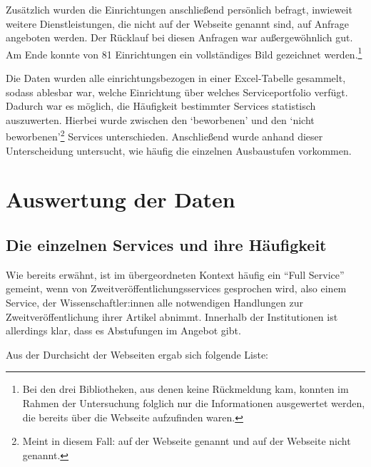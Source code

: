 \documentclass[a4paper,
fontsize=11pt,
oneside,
numbers=noperiodatend,
parskip=half-,
bibliography=totoc,
final
]{scrartcl}
\begin{document}
Zusätzlich wurden die Einrichtungen anschließend persönlich befragt,
inwieweit weitere Dienstleistungen, die nicht auf der Webseite genannt
sind, auf Anfrage angeboten werden. Der Rücklauf bei diesen Anfragen war
außergewöhnlich gut. Am Ende konnte von 81 Einrichtungen ein
vollständiges Bild gezeichnet werden.\footnote{Bei den drei
  Bibliotheken, aus denen keine Rückmeldung kam, konnten im Rahmen der
  Untersuchung folglich nur die Informationen ausgewertet werden, die
  bereits über die Webseite aufzufinden waren.}

Die Daten wurden alle einrichtungsbezogen in einer Excel-Tabelle
gesammelt, sodass ablesbar war, welche Einrichtung über welches
Serviceportfolio verfügt. Dadurch war es möglich, die Häufigkeit
bestimmter Services statistisch auszuwerten. Hierbei wurde zwischen den
\enquote*{beworbenen} und den \enquote*{nicht beworbenen}\footnote{Meint in diesem Fall:
  auf der Webseite genannt und auf der Webseite nicht genannt.} Services
unterschieden. Anschließend wurde anhand dieser Unterscheidung
untersucht, wie häufig die einzelnen Ausbaustufen vorkommen.

\hypertarget{auswertung-der-daten}{%
\section{Auswertung der Daten}\label{auswertung-der-daten}}

\hypertarget{die-einzelnen-services-und-ihre-huxe4ufigkeit}{%
\subsection{Die einzelnen Services und ihre
Häufigkeit}\label{die-einzelnen-services-und-ihre-huxe4ufigkeit}}

Wie bereits erwähnt, ist im übergeordneten Kontext häufig ein
\enquote{Full Service} gemeint, wenn von Zweitveröffentlichungsservices
gesprochen wird, also einem Service, der Wissenschaftler:innen alle
notwendigen Handlungen zur Zweitveröffentlichung ihrer Artikel abnimmt.
Innerhalb der Institutionen ist allerdings klar, dass es Abstufungen im
Angebot gibt.

Aus der Durchsicht der Webseiten ergab sich folgende Liste:
\end{document}

